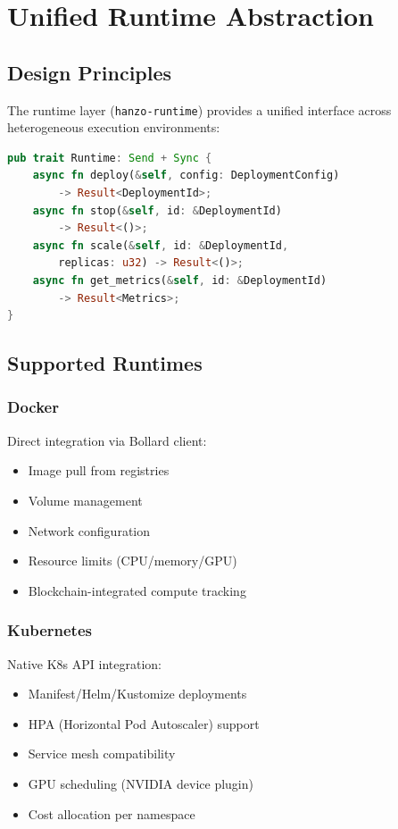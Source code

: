 \section{Unified Runtime Abstraction}


\subsection{Design Principles}

The runtime layer (\texttt{hanzo-runtime}) provides a unified interface across heterogeneous execution environments:

\begin{lstlisting}[language=Rust, basicstyle=\small\ttfamily]
pub trait Runtime: Send + Sync {
    async fn deploy(&self, config: DeploymentConfig)
        -> Result<DeploymentId>;
    async fn stop(&self, id: &DeploymentId)
        -> Result<()>;
    async fn scale(&self, id: &DeploymentId,
        replicas: u32) -> Result<()>;
    async fn get_metrics(&self, id: &DeploymentId)
        -> Result<Metrics>;
}
\end{lstlisting}

\subsection{Supported Runtimes}

\subsubsection{Docker}

Direct integration via Bollard client:
\begin{itemize}
\item Image pull from registries
\item Volume management
\item Network configuration
\item Resource limits (CPU/memory/GPU)
\item Blockchain-integrated compute tracking
\end{itemize}

\subsubsection{Kubernetes}

Native K8s API integration:
\begin{itemize}
\item Manifest/Helm/Kustomize deployments
\item HPA (Horizontal Pod Autoscaler) support
\item Service mesh compatibility
\item GPU scheduling (NVIDIA device plugin)
\item Cost allocation per namespace
\end{itemize}


